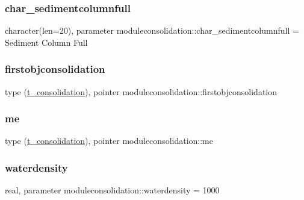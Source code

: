 \subsubsection{\texorpdfstring{char\+\_\+sedimentcolumnfull}{char\_sedimentcolumnfull}}
{\footnotesize\ttfamily character(len=20), parameter moduleconsolidation\+::char\+\_\+sedimentcolumnfull = \textquotesingle{}Sediment Column Full\textquotesingle{}\hspace{0.3cm}{\ttfamily [private]}}

\mbox{\label{namespacemoduleconsolidation_abf614f867a201723e44b18315fa3223d}} 
\subsubsection{\texorpdfstring{firstobjconsolidation}{firstobjconsolidation}}
{\footnotesize\ttfamily type (\mbox{\hyperlink{structmoduleconsolidation_1_1t__consolidation}{t\+\_\+consolidation}}), pointer moduleconsolidation\+::firstobjconsolidation\hspace{0.3cm}{\ttfamily [private]}}

\mbox{\label{namespacemoduleconsolidation_a6a9ef6cb5eb83e8fa553110a7afca22b}} 
\subsubsection{\texorpdfstring{me}{me}}
{\footnotesize\ttfamily type (\mbox{\hyperlink{structmoduleconsolidation_1_1t__consolidation}{t\+\_\+consolidation}}), pointer moduleconsolidation\+::me\hspace{0.3cm}{\ttfamily [private]}}

\mbox{\label{namespacemoduleconsolidation_ae2d4a16a8d18816c8bb53007d7ec0634}} 
\subsubsection{\texorpdfstring{waterdensity}{waterdensity}}
{\footnotesize\ttfamily real, parameter moduleconsolidation\+::waterdensity = 1000\hspace{0.3cm}{\ttfamily [private]}}

